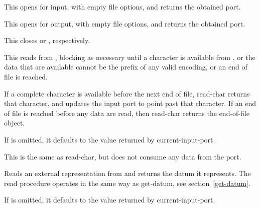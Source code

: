 \begin{entry}{%
}

This opens  for input, with empty file options, and returns
the obtained port.
\end{entry}

\begin{entry}{%
}

This opens  for output, with empty file options, and
returns the obtained port.
\end{entry}

\begin{entry}{%
}

This closes  or , respectively.
\end{entry}

\begin{entry}{%
}

This reads from ,
blocking as necessary until a character
is available from ,
or the data that are available cannot
be the prefix of any valid encoding, or an end of file is reached.

If a complete character is available before the next end of file, {\cf
  read-char} returns that character, and updates the input port to
point past that character. If an end of file is
reached before any data are read, then {\cf read-char} returns the
end-of-file object.

If  is omitted, it defaults to the value returned by
{\cf current-input-port}.
\end{entry}

\begin{entry}{%
}
   
This is the same as {\cf read-char}, but does not consume any data
from the port.
\end{entry}

\begin{entry}{%
}

Reads an external representation from 
and returns the datum it
represents.  The {\cf read} procedure operates in the same way as 
{\cf get-datum}, see section~\ref{get-datum}.

If  is omitted, it defaults to the value returned by
{\cf current-input-port}.
\end{entry}

